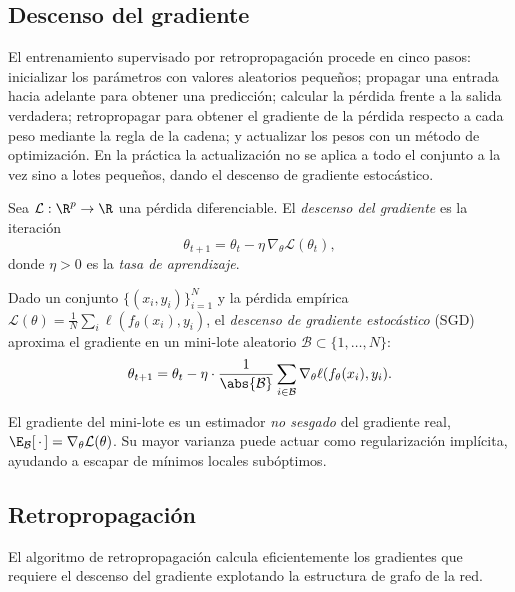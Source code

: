 \subsection{Descenso del gradiente}
\label{sec:found:gradient-descent}

El entrenamiento supervisado por retropropagaci\'on procede en cinco pasos:
inicializar los par\'ametros con valores aleatorios peque\~nos; propagar una
entrada hacia adelante para obtener una predicci\'on; calcular la p\'erdida frente a
la salida verdadera; retropropagar para obtener el gradiente de la p\'erdida
respecto a cada peso mediante la regla de la cadena; y actualizar los pesos con un
m\'etodo de optimizaci\'on. En la pr\'actica la actualizaci\'on no se aplica a todo
el conjunto a la vez sino a lotes peque\~nos, dando el descenso de gradiente
estoc\'astico.

\begin{definition}
\label{def:found:gd}
Sea $\mathcal{L} : \R^p \to \R$ una p\'erdida diferenciable. El \emph{descenso del
gradiente} es la iteraci\'on
\[
  \theta_{t+1} = \theta_t - \eta\, \nabla_\theta \mathcal{L}(\theta_t),
\]
donde $\eta > 0$ es la \emph{tasa de aprendizaje}.
\end{definition}

\begin{definition}
\label{def:found:sgd}
Dado un conjunto $\{(x_i, y_i)\}_{i=1}^N$ y la p\'erdida emp\'irica
$\mathcal{L}(\theta) = \frac{1}{N}\sum_i \ell(f_\theta(x_i), y_i)$, el
\emph{descenso de gradiente estoc\'astico} (SGD) aproxima el gradiente en un
mini-lote aleatorio $\mathcal{B} \subset \{1,\ldots,N\}$:
\[
  \theta_{t+1} = \theta_t - \eta \cdot \frac{1}{\abs{\mathcal{B}}}
  \sum_{i \in \mathcal{B}} \nabla_\theta \ell(f_\theta(x_i), y_i).
\]
\end{definition}

El gradiente del mini-lote es un estimador \emph{no sesgado} del gradiente real,
$\E_{\mathcal{B}}[\,\cdot\,] = \nabla_\theta \mathcal{L}(\theta)$. Su mayor
varianza puede actuar como regularizaci\'on impl\'icita, ayudando a escapar de
m\'inimos locales sub\'optimos.

\subsection{Retropropagaci\'on}
\label{sec:found:backprop}

El algoritmo de retropropagaci\'on calcula eficientemente los gradientes que
requiere el descenso del gradiente explotando la estructura de grafo de la red.

